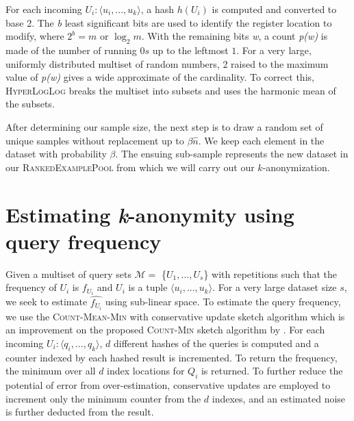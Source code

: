 \documentclass[letterpaper]{article}
\begin{document}
For each incoming \begin{math} U_i : \langle u_i, ..., u_k \rangle \end{math}, a hash \begin{math}h(U_i) \end{math} is computed and converted to base 2. The \textit{b} least significant bits are used to identify the register location to modify, where \begin{math} 2^b = m \end{math} or $\log_2 m$. With the remaining bits \textit{w}, a count \textit{p(w)} is made of the number of running $0s$ up to the leftmost $1$. For a very large, uniformly distributed multiset of random numbers, 2 raised to the maximum value of \textit{p(w)} gives a wide approximate of the cardinality. To correct this, \textsc{HyperLogLog} breaks the multiset into subsets and uses the harmonic mean of the subsets.

After determining our sample size, the next step is to draw a random set of unique samples without replacement up to $\beta\hat{n}$. We keep each element in the dataset with probability $\beta$. The ensuing sub-sample represents the new dataset in our \textsc{RankedExamplePool} from which we will carry out our $k$-anonymization.



\section{Estimating \textit{k}-anonymity using query frequency}
Given a multiset of query sets $ \mathcal{M} =  $ \{$U_1, ..., U_s $\} with repetitions such that the frequency of $U_i$ is $f_{U_i}$ and $ U_i $ is a tuple \begin{math} \langle u_i, ..., u_k \rangle \end{math}. For a very large dataset size $s$, we seek to estimate $\hat{f_{U_i}}$ using sub-linear space. To estimate the query frequency, we use the \textsc{Count-Mean-Min} with conservative update \cite{goyal2012sketch} sketch algorithm which is an improvement on the proposed \textsc{Count-Min} sketch algorithm by \cite{cormode2005improved}. For each incoming $ U_i : \langle q_i, ..., q_k \rangle $, $d$ different hashes of the queries is computed and a counter indexed by each hashed result is incremented. To return the frequency, the minimum over all $d$ index locations for $Q_i$ is returned. To further reduce the potential of error from over-estimation, conservative updates are employed to increment only the minimum counter from the $d$ indexes, and an estimated noise is further deducted from the result.
\end{document}
